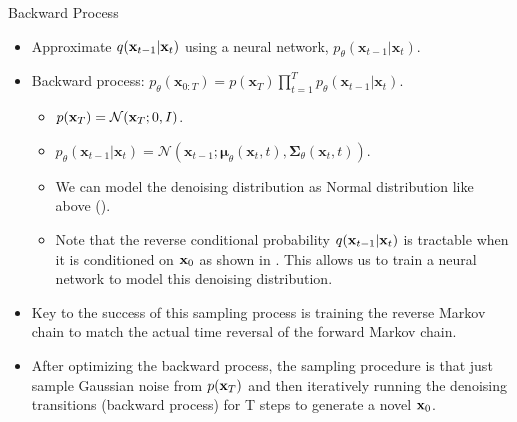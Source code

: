 Backward Process
	\begin{itemize}
		\item Approximate $q({\mathbf{x}}_{t-1}|{\mathbf{x}}_t)$ using a neural network, $p_\theta(\mathbf{x}_{t-1} \vert \mathbf{x}_t)$.
		\item Backward process: $p_\theta(\mathbf{x}_{0:T}) = p(\mathbf{x}_T) \prod^T_{t=1} p_\theta(\mathbf{x}_{t-1} \vert \mathbf{x}_t)$.
			\begin{itemize}
				\item $p({\mathbf{x}}_T) = \mathcal{N}({\mathbf{x}}_T;0,I)$.
				\item $p_\theta(\mathbf{x}_{t-1} \vert \mathbf{x}_t) = \mathcal{N}(\mathbf{x}_{t-1}; \boldsymbol{\mu}_\theta(\mathbf{x}_t, t), \boldsymbol{\Sigma}_\theta(\mathbf{x}_t, t))$.  

				\item We can model the denoising distribution as Normal distribution like above (\cf {}).
				\item Note that the reverse conditional probability $q({\mathbf{x}}_{t-1}|{\mathbf{x}}_t)$ is tractable when it is conditioned on ${\mathbf{x}}_0$ as shown in . This allows us to train a neural network to model this denoising distribution. 
			\end{itemize}
		\item Key to the success of this sampling process is training the reverse Markov chain to match the actual time reversal of the forward Markov chain. 
		\item After optimizing the backward process, the sampling procedure is that just sample Gaussian noise from $p({\mathbf{x}}_T)$ and then iteratively running the denoising transitions (backward process) for T steps to generate a novel ${\mathbf{x}}_0$.
	\end{itemize}

